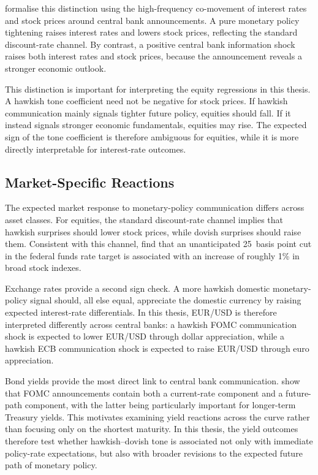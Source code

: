 \citet{jarocinski2020} formalise this distinction using the
high-frequency co-movement of interest rates and stock prices around
central bank announcements. A pure monetary policy tightening raises
interest rates and lowers stock prices, reflecting the standard
discount-rate channel. By contrast, a positive central bank information
shock raises both interest rates and stock prices, because the
announcement reveals a stronger economic outlook.

This distinction is important for interpreting the equity regressions in
this thesis. A hawkish tone coefficient need not be negative for stock
prices. If hawkish communication mainly signals tighter future policy,
equities should fall. If it instead signals stronger economic
fundamentals, equities may rise. The expected sign of the tone
coefficient is therefore ambiguous for equities, while it is more
directly interpretable for interest-rate outcomes.

\subsection{Market-Specific Reactions}

The expected market response to monetary-policy communication differs
across asset classes. For equities, the standard discount-rate channel
implies that hawkish surprises should lower stock prices, while dovish
surprises should raise them. Consistent with this channel,
\citet{bernanke2005} find that an unanticipated 25~basis point cut in
the federal funds rate target is associated with an increase of roughly
1\% in broad stock indexes.

Exchange rates provide a second sign check. A more hawkish domestic
monetary-policy signal should, all else equal, appreciate the domestic
currency by raising expected interest-rate differentials. In this thesis,
EUR/USD is therefore interpreted differently across central banks: a
hawkish FOMC communication shock is expected to lower EUR/USD through
dollar appreciation, while a hawkish ECB communication shock is expected
to raise EUR/USD through euro appreciation.

Bond yields provide the most direct link to central bank communication.
\citet{gurkaynak2005} show that FOMC announcements contain both a
current-rate component and a future-path component, with the latter being
particularly important for longer-term Treasury yields. This motivates
examining yield reactions across the curve rather than focusing only on
the shortest maturity. In this thesis, the yield outcomes therefore test
whether hawkish--dovish tone is associated not only with immediate
policy-rate expectations, but also with broader revisions to the expected
future path of monetary policy.

